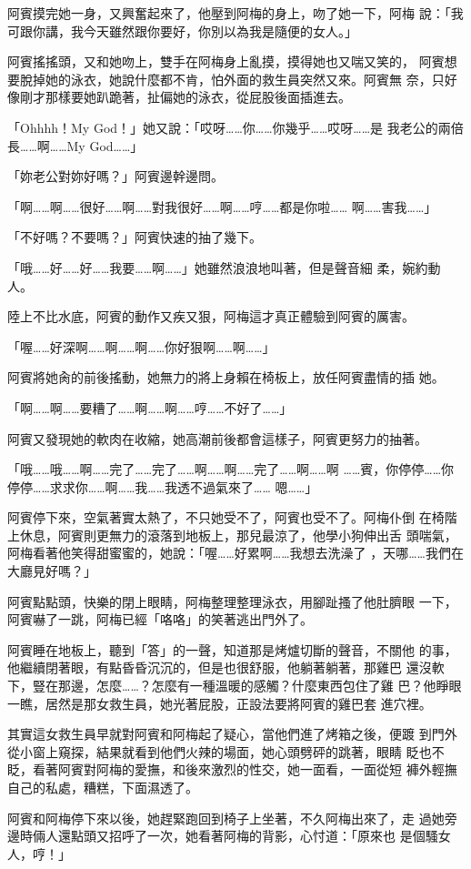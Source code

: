 阿賓摸完她一身，又興奮起來了，他壓到阿梅的身上，吻了她一下，阿梅
說：「我可跟你講，我今天雖然跟你要好，你別以為我是隨便的女人。」

阿賓搖搖頭，又和她吻上，雙手在阿梅身上亂摸，摸得她也又喘又笑的，
阿賓想要脫掉她的泳衣，她說什麼都不肯，怕外面的救生員突然又來。阿賓無
奈，只好像剛才那樣要她趴跪著，扯偏她的泳衣，從屁股後面插進去。

「Ohhhh！My God！」她又說：「哎呀……你……你幾乎……哎呀……是
我老公的兩倍長……啊……My God……」

「妳老公對妳好嗎？」阿賓邊幹邊問。

「啊……啊……很好……啊……對我很好……啊……哼……都是你啦……
啊……害我……」

「不好嗎？不要嗎？」阿賓快速的抽了幾下。

「哦……好……好……我要……啊……」她雖然浪浪地叫著，但是聲音細
柔，婉約動人。

陸上不比水底，阿賓的動作又疾又狠，阿梅這才真正體驗到阿賓的厲害。

「喔……好深啊……啊……啊……你好狠啊……啊……」

阿賓將她肏的前後搖動，她無力的將上身賴在椅板上，放任阿賓盡情的插
她。

「啊……啊……要糟了……啊……啊……哼……不好了……」

阿賓又發現她的軟肉在收縮，她高潮前後都會這樣子，阿賓更努力的抽著。

「哦……哦……啊……完了……完了……啊……啊……完了……啊……啊
……賓，你停停……你停停……求求你……啊……我……我透不過氣來了……
嗯……」

阿賓停下來，空氣著實太熱了，不只她受不了，阿賓也受不了。阿梅仆倒
在椅階上休息，阿賓則更無力的滾落到地板上，那兒最涼了，他學小狗伸出舌
頭喘氣，阿梅看著他笑得甜蜜蜜的，她說：「喔……好累啊……我想去洗澡了
，天哪……我們在大廳見好嗎？」

阿賓點點頭，快樂的閉上眼睛，阿梅整理整理泳衣，用腳趾搔了他肚臍眼
一下，阿賓嚇了一跳，阿梅已經「咯咯」的笑著逃出門外了。

阿賓睡在地板上，聽到「答」的一聲，知道那是烤爐切斷的聲音，不關他
的事，他繼續閉著眼，有點昏昏沉沉的，但是也很舒服，他躺著躺著，那雞巴
還沒軟下，豎在那邊，怎麼……？怎麼有一種溫暖的感觸？什麼東西包住了雞
巴？他睜眼一瞧，居然是那女救生員，她光著屁股，正設法要將阿賓的雞巴套
進穴裡。

其實這女救生員早就對阿賓和阿梅起了疑心，當他們進了烤箱之後，便踱
到門外從小窗上窺探，結果就看到他們火辣的場面，她心頭劈砰的跳著，眼睛
眨也不眨，看著阿賓對阿梅的愛撫，和後來激烈的性交，她一面看，一面從短
褲外輕撫自己的私處，糟糕，下面濕透了。

阿賓和阿梅停下來以後，她趕緊跑回到椅子上坐著，不久阿梅出來了，走
過她旁邊時倆人還點頭又招呼了一次，她看著阿梅的背影，心忖道：「原來也
是個騷女人，哼！」

